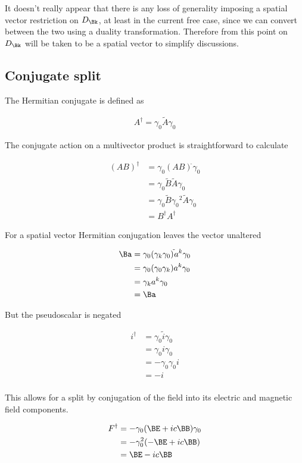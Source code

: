 It doesn't really appear that there is any loss of generality imposing a spatial vector restriction on $D_\Bk$, at
least in the current free case, since we can convert between the two using a duality transformation.
Therefore from this point on $D_\Bk$ will be taken to be a spatial vector to simplify discussions.

\subsection{Conjugate split}

The Hermitian conjugate is defined as

\begin{align}
A^\dagger = \gamma_0 \tilde{A} \gamma_0
\end{align}

The conjugate action on a multivector product is straightforward to calculate

\begin{align*}
(A B)^\dagger 
&= \gamma_0 (A B)^{\tilde{}} \gamma_0 \\
&= \gamma_0 \tilde{B} \tilde{A} \gamma_0 \\
&= \gamma_0 \tilde{B} {\gamma_0}^2 \tilde{A} \gamma_0 \\
&= B^\dagger A^\dagger
\end{align*}

For a spatial vector Hermitian conjugation leaves the vector unaltered

\begin{align*}
\Ba 
&= \gamma_0 (\gamma_k \gamma_0)^{\tilde{}} a^k \gamma_0 \\
&= \gamma_0 (\gamma_0 \gamma_k) a^k \gamma_0 \\
&= \gamma_k a^k \gamma_0 \\
&= \Ba
\end{align*}

But the pseudoscalar is negated

\begin{align*}
i^\dagger 
&=
\gamma_0 \tilde{i} \gamma_0 \\
&=
\gamma_0 i \gamma_0 \\
&=
-\gamma_0 \gamma_0 i \\
&=
- i \\
\end{align*}

This allows for a split by conjugation of the field into its electric and magnetic field components.

\begin{align*}
F^\dagger
&= -\gamma_0 ( \BE + i c \BB) \gamma_0 \\
&= -\gamma_0^2 ( -\BE + i c \BB) \\
&= \BE - i c\BB \\
\end{align*}

